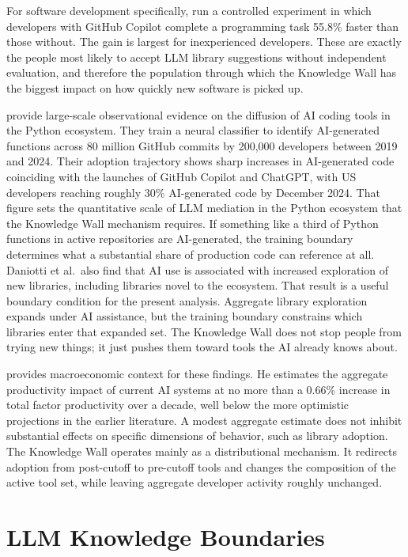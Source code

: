 \documentclass[12pt, a4paper]{report}
\begin{document}
For software development specifically, \citet{peng2023impact} run a controlled experiment in which developers with GitHub Copilot complete a programming task 55.8\% faster than those without. The gain is largest for inexperienced developers. These are exactly the people most likely to accept LLM library suggestions without independent evaluation, and therefore the population through which the Knowledge Wall has the biggest impact on how quickly new software is picked up.

\citet{daniotti2025who} provide large-scale observational evidence on the diffusion of AI coding tools in the Python ecosystem. They train a neural classifier to identify AI-generated functions across 80 million GitHub commits by 200{,}000 developers between 2019 and 2024. Their adoption trajectory shows sharp increases in AI-generated code coinciding with the launches of GitHub Copilot and ChatGPT, with US developers reaching roughly 30\% AI-generated code by December 2024. That figure sets the quantitative scale of LLM mediation in the Python ecosystem that the Knowledge Wall mechanism requires. If something like a third of Python functions in active repositories are AI-generated, the training boundary determines what a substantial share of production code can reference at all. Daniotti et al.\ also find that AI use is associated with increased exploration of new libraries, including libraries novel to the ecosystem. That result is a useful boundary condition for the present analysis. Aggregate library exploration expands under AI assistance, but the training boundary constrains which libraries enter that expanded set. The Knowledge Wall does not stop people from trying new things; it just pushes them toward tools the AI already knows about.

\citet{acemoglu2024simple} provides macroeconomic context for these findings. He estimates the aggregate productivity impact of current AI systems at no more than a 0.66\% increase in total factor productivity over a decade, well below the more optimistic projections in the earlier literature. A modest aggregate estimate does not inhibit substantial effects on specific dimensions of behavior, such as library adoption. The Knowledge Wall operates mainly as a distributional mechanism. It redirects adoption from post-cutoff to pre-cutoff tools and changes the composition of the active tool set, while leaving aggregate developer activity roughly unchanged.

\section{LLM Knowledge Boundaries}\label{sec:lit-boundaries}
\end{document}
